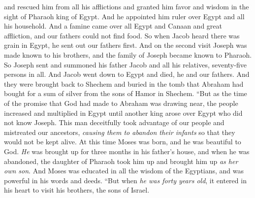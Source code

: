 \begin{biblechapter}
\verse and rescued him from all his afflictions and granted him favor and wisdom in the sight of Pharaoh king of Egypt. And he appointed him ruler over Egypt and all his household.
\verse And a famine came over all Egypt and Canaan and great affliction, and our fathers could not find food.
\verse So when Jacob heard there was grain in Egypt, he sent out our fathers first.
\verse And on the second visit Joseph was made known to his brothers, and the family of Joseph became known to Pharaoh.
\verse So Joseph sent and summoned his father Jacob and all his relatives, seventy-five persons in all.
\verse And Jacob went down to Egypt and died, he and our fathers.
\verse And they were brought back to Shechem and buried in the tomb that Abraham had bought for a sum of silver from the sons of Hamor in Shechem.
\verse “But as the time of the promise that God had made to Abraham was drawing near, the people increased and multiplied in Egypt
\verse until another king arose over Egypt who did not know Joseph.
\verse This man deceitfully took advantage of our people and mistreated our ancestors, \textit{causing them to abandon their infants} so that they would not be kept alive.
\verse At this time Moses was born, and he was beautiful to God. \textit{He} was brought up for three months in his father’s house,
\verse and when he was abandoned, the daughter of Pharaoh took him up and brought him up \textit{as her own son}.
\verse And Moses was educated in all the wisdom of the Egyptians, and was powerful in his words and deeds.
\verse “But when \textit{he was forty years old}, it entered in his heart to visit his brothers, the sons of Israel.

\end{biblechapter}
